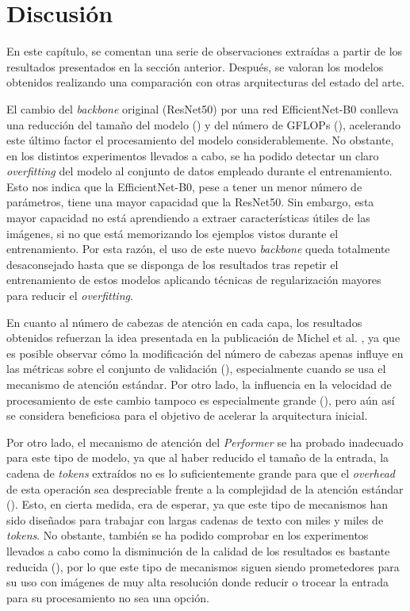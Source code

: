 \section{Discusión}

En este capítulo, se comentan una serie de observaciones extraídas a partir de los resultados presentados en la sección anterior. Después, se valoran los modelos obtenidos realizando una comparación con otras arquitecturas del estado del arte.

El cambio del \textit{backbone} original (ResNet50) por una red EfficientNet-B0 conlleva una reducción del tamaño del modelo () y del número de GFLOPs (), acelerando este último factor el procesamiento del modelo considerablemente. No obstante, en los distintos experimentos llevados a cabo, se ha podido detectar un claro \textit{overfitting} del modelo al conjunto de datos empleado durante el entrenamiento. Esto nos indica que la EfficientNet-B0, pese a tener un menor número de parámetros, tiene una mayor capacidad que la ResNet50. Sin embargo, esta mayor capacidad no está aprendiendo a extraer características útiles de las imágenes, si no que está memorizando los ejemplos vistos durante el entrenamiento. Por esta razón, el uso de este nuevo \textit{backbone} queda totalmente desaconsejado hasta que se disponga de los resultados tras repetir el entrenamiento de estos modelos aplicando técnicas de regularización mayores para reducir el \textit{overfitting}.

En cuanto al número de cabezas de atención en cada capa, los resultados obtenidos refuerzan la idea presentada en la publicación de Michel et al. \cite{are16headsbetterthan1}, ya que es posible observar cómo la modificación del número de cabezas apenas influye en las métricas sobre el conjunto de validación (), especialmente cuando se usa el mecanismo de atención estándar. Por otro lado, la influencia en la velocidad de procesamiento de este cambio tampoco es especialmente grande (), pero aún así se considera beneficiosa para el objetivo de acelerar la arquitectura inicial.

Por otro lado, el mecanismo de atención del \textit{Performer} se ha probado inadecuado para este tipo de modelo, ya que al haber reducido el tamaño de la entrada, la cadena de \textit{tokens} extraídos no es lo suficientemente grande para que el \textit{overhead} de esta operación sea despreciable frente a la complejidad de la atención estándar (). Esto, en cierta medida, era de esperar, ya que este tipo de mecanismos han sido diseñados para trabajar con largas cadenas de texto con miles y miles de \textit{tokens}. No obstante, también se ha podido comprobar en los experimentos llevados a cabo como la disminución de la calidad de los resultados es bastante reducida (), por lo que este tipo de mecanismos siguen siendo prometedores para su uso con imágenes de muy alta resolución donde reducir o trocear la entrada para su procesamiento no sea una opción.

